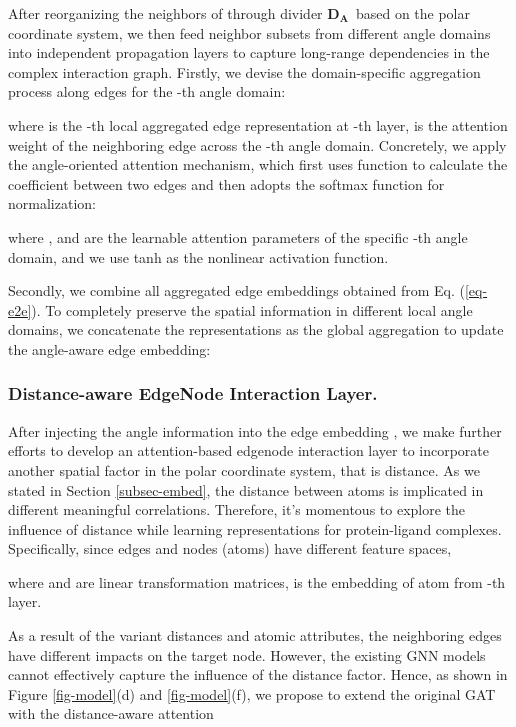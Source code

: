 \documentclass[sigconf]{acmart}
\newcommand{\angleD}{\ensuremath{\bm{D_A}}}
\begin{document}
After reorganizing the neighbors of  through divider \angleD\  based on the polar coordinate system, we then feed  neighbor subsets from different angle domains into  independent propagation layers to capture long-range dependencies in the complex interaction graph. Firstly, we devise the domain-specific aggregation process along edges for the -th angle domain:

where  is the -th local aggregated edge representation at -th layer,  is the attention weight of the neighboring edge  across the -th angle domain. Concretely, we apply the angle-oriented attention mechanism, which first uses  function to calculate the coefficient between two edges and then adopts the softmax function for normalization:

where ,  and  are the learnable attention parameters of the specific -th angle domain, and we use tanh as the nonlinear activation function.

Secondly, we combine all aggregated edge embeddings obtained from Eq. (\ref{eq-e2e}). To completely preserve the spatial information in different local angle domains, we concatenate the representations as the global aggregation to update the angle-aware edge embedding:



\subsubsection{Distance-aware EdgeNode Interaction Layer.}
After injecting the angle information into the edge embedding , we make further efforts to develop an attention-based edgenode interaction layer to incorporate another spatial factor in the polar coordinate system, that is distance. As we stated in Section \ref{subsec-embed}, the distance between atoms is implicated in different meaningful correlations. Therefore, it's momentous to explore the influence of distance while learning representations for protein-ligand complexes. Specifically, since edges and nodes (atoms) have different feature spaces, 

where  and  are linear transformation matrices,  is the embedding of atom  from -th layer. 

As a result of the variant distances and atomic attributes, the neighboring edges have different impacts on the target node. However, the existing GNN models cannot effectively capture the influence of the distance factor. Hence, as shown in Figure \ref{fig-model}(d) and \ref{fig-model}(f), we propose to extend the original GAT \cite{velivckovic2018graph} with the distance-aware attention 
\end{document}
